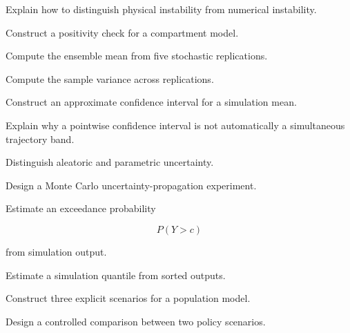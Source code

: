 \begin{exercise}[3]
Explain how to distinguish physical instability from numerical
instability.
\end{exercise}

\begin{exercise}[3]
Construct a positivity check for a compartment model.
\end{exercise}

\begin{exercise}[2]
Compute the ensemble mean from five stochastic replications.
\end{exercise}

\begin{exercise}[2]
Compute the sample variance across replications.
\end{exercise}

\begin{exercise}[3]
Construct an approximate confidence interval for a simulation mean.
\end{exercise}

\begin{exercise}[3]
Explain why a pointwise confidence interval is not automatically a
simultaneous trajectory band.
\end{exercise}

\begin{exercise}[3]
Distinguish aleatoric and parametric uncertainty.
\end{exercise}

\begin{exercise}[3]
Design a Monte Carlo uncertainty-propagation experiment.
\end{exercise}

\begin{exercise}[3]
Estimate an exceedance probability

\[
P(Y>c)
\]

from simulation output.
\end{exercise}

\begin{exercise}[3]
Estimate a simulation quantile from sorted outputs.
\end{exercise}

\begin{exercise}[2]
Construct three explicit scenarios for a population model.
\end{exercise}

\begin{exercise}[3]
Design a controlled comparison between two policy scenarios.
\end{exercise}

